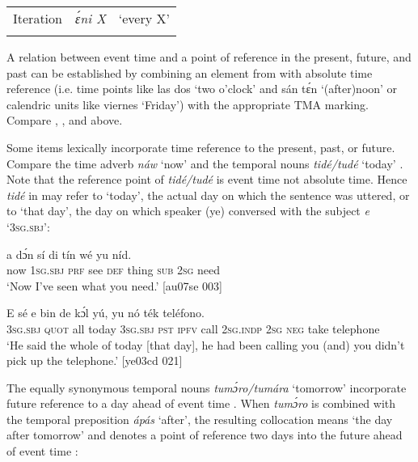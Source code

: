 \begin{table}
\begin{tabularx}{\textwidth}{lXX}
\tablevspace
Iteration & \itshape ɛ́ni X & ‘every X’\\
\lspbottomrule
\end{tabularx}
\end{table}
A relation between event time and a point of reference in the present, future, and past can be established by combining an element from  with absolute time reference (i.e. time points like las dos ‘two o’clock’ and sán tɛ́n ‘(after)noon’ or calendric units like viernes ‘Friday’) with the appropriate TMA marking. Compare , , and  above. 


Some items lexically incorporate time reference to the present, past, or future. Compare the time adverb \textit{náw} ‘now’  and the temporal nouns \textit{tidé/tudé} ‘today’ . Note that the reference point of \textit{tidé/tudé} is event time not absolute time. Hence \textit{tidé} in  may refer to ‘today’, the actual day on which the sentence was uttered, or to ‘that day’, the day on which speaker (ye) conversed with the subject \textit{e} ‘\textsc{3sg.sbj}’:



\ea%
    \label{ex:key:1008}
    \gll {}    a    dɔ́n  sí  di  tín    wé  yu  níd.\\
now    \textsc{1sg.sbj}  \textsc{prf}  see  \textsc{def}  thing  \textsc{sub}  \textsc{2sg}  need\\

\glt ‘Now I’ve seen what you need.’ [au07se 003]
\z


\ea%
    \label{ex:key:1009}
    \gll E    sé          e    bin  de  kɔ́l  yú,
yu  nó  ték    teléfono.\\
\textsc{3sg.sbj}  \textsc{quot}    all  today  \textsc{3sg.sbj}  \textsc{pst}  \textsc{ipfv}  call  \textsc{2sg.indp}
\textsc{2sg}  \textsc{neg} take    telephone\\

\glt ‘He said the whole of today [that day], he had been calling you (and) you didn’t 
pick up the telephone.’ [ye03cd 021]
\z

The equally synonymous temporal nouns \textit{tumɔ́ro/tumára} ‘tomorrow’ incorporate future reference to a day ahead of event time . When \textit{tumɔ́ro} is combined with the temporal preposition \textit{ápás} ‘after’, the resulting collocation means ‘the day after tomorrow’ and denotes a point of reference two days into the future ahead of event time :


